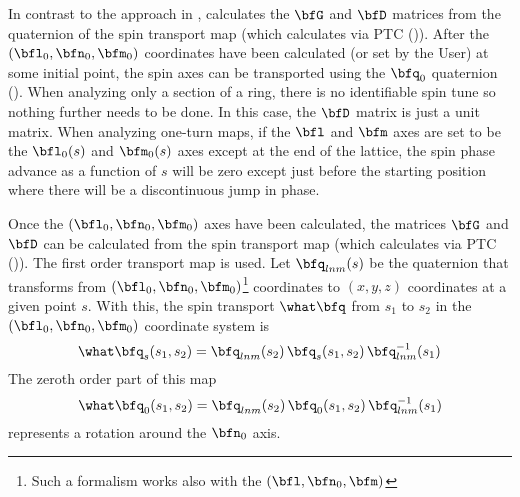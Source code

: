 {In contrast to the approach in \cite{b:barber85,b:barber99}, \bmad calculates the $\bfG$ and $\bfD$
matrices from the quaternion of the spin transport map (which \bmad calculates via PTC
()). After the $(\bfl_0, \bfn_0, \bfm_0)$ coordinates have been calculated (or set by
the User) at some initial point, the spin axes can be transported using the $\bfq_0$ quaternion
(). When analyzing only a section of a ring, there is no identifiable spin tune so nothing
further needs to be done. In this case, the $\bfD$ matrix is just a unit matrix. When analyzing
one-turn maps, if the $\bfl$ and $\bfm$ axes are set to be the $\bfl_0(s)$ and $\bfm_0(s)$ axes
except at the end of the lattice, the spin phase advance as a function of $s$ will be zero except
just before the starting position where there will be a discontinuous jump in phase.

Once the $(\bfl_0, \bfn_0, \bfm_0)$ axes have been calculated, the matrices $\bfG$ and $\bfD$ can be
calculated from the spin transport map (which \bmad calculates via PTC ()).  The
first order transport map  is used. Let $\bfq_{lnm}(s)$ be the quaternion that transforms
from $(\bfl_0, \bfn_0, \bfm_0)$\footnote{ Such a formalism works also with the $(\bfl, \bfn_0,
\bfm)$} coordinates to $(x, y, z)$ coordinates at a given point $s$. With this, the spin transport
$\what\bfq$ from $s_1$ to $s_2$ in the $(\bfl_0, \bfn_0, \bfm_0)$ coordinate system is
\begin{equation}
  \what\bfq_s(s_1, s_2) = \bfq_{lnm}(s_2) \, \bfq_s(s_1, s_2) \, \bfq_{lnm}^{-1}(s_1)
\end{equation}
The zeroth order part of this map 
\begin{equation}
  \what\bfq_0(s_1,s_2) = \bfq_{lnm}(s_2) \, \bfq_0(s_1, s_2) \, \bfq_{lnm}^{-1}(s_1) 
\end{equation}
represents a rotation around the $\bfn_0$ axis. 

}

